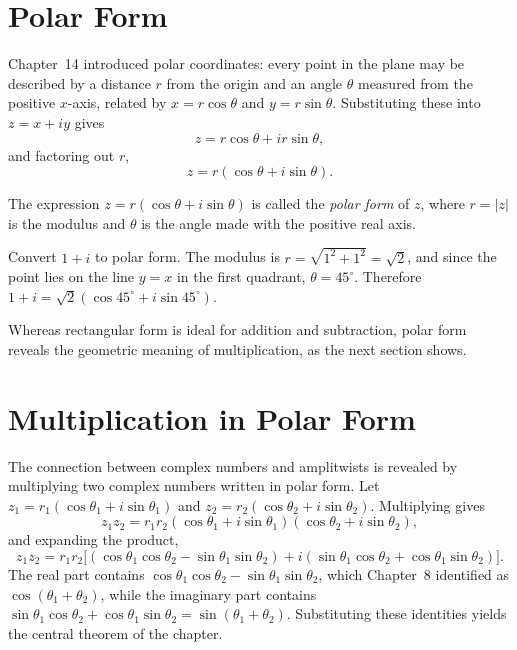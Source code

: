 \section{Polar Form}

Chapter~14 introduced polar coordinates: every point in the plane may be
described by a distance $r$ from the origin and an angle $\theta$
measured from the positive $x$-axis, related by $x = r\cos\theta$ and $y
= r\sin\theta$. Substituting these into $z = x+iy$ gives
\[
z = r\cos\theta + ir\sin\theta,
\]
and factoring out $r$,
\[
z = r(\cos\theta + i\sin\theta).
\]

\begin{definition}
The expression $z = r(\cos\theta+i\sin\theta)$ is called the \emph{polar
form} of $z$, where $r = |z|$ is the modulus and $\theta$ is the angle
made with the positive real axis.
\end{definition}

\begin{example}
Convert $1+i$ to polar form. The modulus is $r = \sqrt{1^2+1^2} =
\sqrt2$, and since the point lies on the line $y=x$ in the first
quadrant, $\theta = 45^\circ$. Therefore $1+i = \sqrt2(\cos45^\circ +
i\sin45^\circ)$.
\end{example}

Whereas rectangular form is ideal for addition and subtraction, polar
form reveals the geometric meaning of multiplication, as the next section
shows.

\section{Multiplication in Polar Form}

The connection between complex numbers and amplitwists is revealed by
multiplying two complex numbers written in polar form. Let $z_1 =
r_1(\cos\theta_1+i\sin\theta_1)$ and $z_2 =
r_2(\cos\theta_2+i\sin\theta_2)$. Multiplying gives
\[
z_1z_2 = r_1r_2(\cos\theta_1+i\sin\theta_1)(\cos\theta_2+i\sin\theta_2),
\]
and expanding the product,
\[
z_1z_2 = r_1r_2\Big[(\cos\theta_1\cos\theta_2 - \sin\theta_1\sin\theta_2)
+ i(\sin\theta_1\cos\theta_2 + \cos\theta_1\sin\theta_2)\Big].
\]
The real part contains $\cos\theta_1\cos\theta_2 -
\sin\theta_1\sin\theta_2$, which Chapter~8 identified as
$\cos(\theta_1+\theta_2)$, while the imaginary part contains
$\sin\theta_1\cos\theta_2 + \cos\theta_1\sin\theta_2 =
\sin(\theta_1+\theta_2)$. Substituting these identities yields the
central theorem of the chapter.

